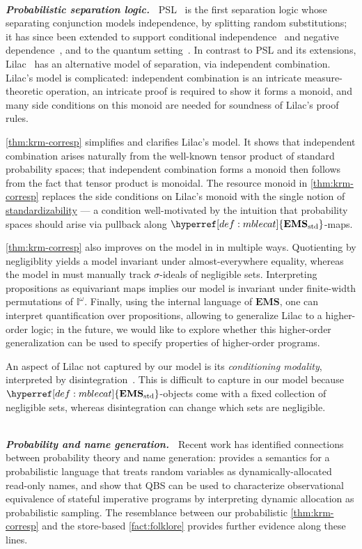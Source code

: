 \documentclass[
  sigconf,
  screen, ]{acmart}
\theoremstyle{definition}
\newcommand\goodparagraph[1]{\hspace{0em}\\[-0.5em]\textbf{\textit{#1.~}}}
\newcommand\nref[2]{\hyperref[#1]{#2}} \newcommand\checkhigh{{\huge{\color{red}\textbf{TODO: check}}}}
\newcommand\texhcube{{{{\mathbb I}^\omega}}}
\newcommand\hcube{{\nref{def:hcube}{\texhcube}}}
\newcommand\goodsheafcat{\mathbf{EMS}}
\newcommand\texStdMble{\mathbf{EMS}_{\rm std}}
\newcommand\StdMble{{\nref{def:mblecat}{\texStdMble}}}
\newcommand\sheafcat{{\nref{def:sheafcat}{\goodsheafcat}}}
\begin{document}
\goodparagraph{Probabilistic separation logic}
PSL~\citep{barthe2019probabilistic} is the
first separation logic whose separating conjunction models
independence, by splitting random substitutions; 
it has since been extended to support
conditional independence~\citep{bao2021bunched} 
and negative dependence~\citep{bao2022separation},
and to the quantum setting~\citep{zhou2021quantum}.
In contrast to PSL and its extensions,
Lilac~\citep{li2023lilac} has
an alternative model of separation,
via independent combination.
Lilac's model is complicated:
independent combination is an intricate measure-theoretic operation,
an intricate proof is required to show it forms a monoid,
and many side conditions on this monoid are
needed for soundness of Lilac's proof rules.

\cref{thm:krm-corresp} simplifies and clarifies Lilac's model.
It shows that independent combination arises naturally
from the well-known tensor product of standard probability spaces;
that independent combination
forms a monoid then follows from the fact that tensor product is monoidal.
The resource monoid in \cref{thm:krm-corresp}
replaces the side conditions on Lilac's monoid
with the single notion of \nref{def:standardizable}{standardizability} ---
a condition well-motivated by the intuition that probability spaces
should arise via pullback along $\StdMble$-maps.

\cref{thm:krm-corresp} also
improves on the model in \citet{li2023lilac}
in multiple ways.
Quotienting by negligiblity
yields a model invariant under
almost-everywhere equality, whereas
the model in \citet{li2023lilac} must manually track $\sigma$-ideals 
of negligible sets.
Interpreting propositions as equivariant maps
implies our model is
invariant under finite-width permutations of $\hcube$.
Finally, using the internal language of $\sheafcat$,
one can interpret quantification over propositions,
allowing to generalize
Lilac to a higher-order logic;
in the future, we would like to explore whether this higher-order generalization
can be used to specify properties of higher-order programs.

An aspect of Lilac not captured by our model
is its \emph{conditioning modality},
interpreted by disintegration~\citep{chang1997conditioning}.
This is difficult to capture in our model because $\StdMble$-objects
come with a fixed collection of negligible sets, whereas
disintegration can change which sets are negligible.


\goodparagraph{Probability and name generation}
Recent work has identified connections between probability theory
and name generation:
\citet{staton2016semantics} provides a semantics for a
probabilistic language
that treats random variables as dynamically-allocated read-only
names, and
\citet{sabok2021probabilistic} show that QBS can be used
to characterize observational equivalence of stateful imperative programs
by interpreting dynamic allocation
as probabilistic sampling.
The resemblance between our probabilistic \cref{thm:krm-corresp} and
the store-based \cref{fact:folklore} provides further evidence
along these lines.
\end{document}
